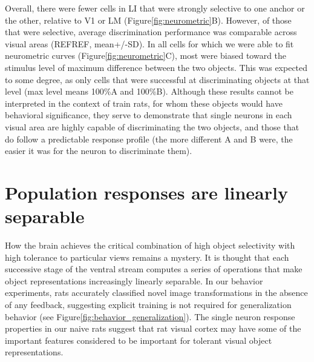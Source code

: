 Overall, there were fewer cells in LI that were strongly selective to one anchor or the other, relative to V1 or LM (Figure\ref{fig:neurometric}B). However, of those that were selective, average discrimination performance was comparable across visual areas (REFREF, mean+/-SD). In all cells for which we were able to fit neurometric curves (Figure\ref{fig:neurometric}C), most were biased toward the stimulus level of maximum difference between the two objects. This was expected to some degree, as only cells that were successful at discriminating objects at that level (max level means 100\%A and 100\%B). Although these results cannot be interpreted in the context of train rats, for whom these objects would have behavioral significance, they serve to demonstrate that single neurons in each visual area are highly capable of discriminating the two objects, and those that do follow a predictable response profile (the more different A and B were, the easier it was for the neuron to discriminate them).  


\section{Population responses are linearly separable}
How the brain achieves the critical combination of high object selectivity with high tolerance to particular views remains a mystery. It is thought that each successive stage of the ventral stream computes a series of operations that make object representations increasingly linearly separable. In our behavior experiments, rats accurately classified novel image transformations in the absence of any feedback, suggesting explicit training is not required for generalization behavior (see Figure\ref{fig:behavior_generalization}). The single neuron response properties in our naive rats suggest that rat visual cortex may have some of the important features considered to be important for tolerant visual object representations.


